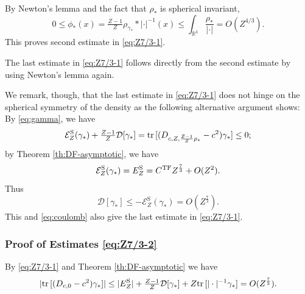 \documentclass[a4paper]{amsart}
\def\tr{{\rm tr \,}}
\def\R{\mathbb{R}}
\def\cD{\mathcal{D}}
\def\cE{{\mathcal E}}
\begin{document}
By Newton's lemma and the fact that $\rho_*$ is spherical invariant,
\begin{equation}
  0\leq\phi_*(x)=\tfrac{Z-1}{Z}\rho_{\gamma_*}*|\cdot|^{-1}(x)\leq \int_{\R^3}\frac{\rho_*}{|\cdot|}=O(Z^{4/3}).
\end{equation}
This proves second estimate in \eqref{eq:Z7/3-1}. 

The last estimate in \eqref{eq:Z7/3-1} follows directly from the
second estimate by using Newton's lemma again.

We remark, though, that the last estimate in \eqref{eq:Z7/3-1} does
not hinge on the spherical symmetry of the density as the following
alternative argument shows: By \eqref{eq:gamma}, we have
\begin{equation}
  \cE_{Z}^{\rm S}(\gamma_*)+\tfrac{Z-1}{Z}\cD[\gamma_*]
  = \tr[(D_{c,Z,\frac{Z-1}{Z}\rho_*}-c^2)\gamma_*]\leq 0;
\end{equation}
by Theorem \ref{th:DF-asymptotic}, we have
\begin{equation}
    \cE_{Z}^{\rm S}(\gamma_*) =E_{Z}^{\rm S} = C^\mathrm{TF}Z^{\frac73} +O(Z^2).
\end{equation}
Thus
\begin{equation}\label{eq:D-gamma}
    \cD[\gamma_*]\leq -\cE_{Z}^\mathrm{S}(\gamma_*)=O(Z^{\frac73}).
\end{equation}
This and \eqref{eq:coulomb} also give the last estimate in \eqref{eq:Z7/3-1}.

\subsubsection{Proof of Estimates \eqref{eq:Z7/3-2}}
By \eqref{eq:Z7/3-1} and Theorem \ref{th:DF-asymptotic} we have
\begin{align}\label{eq:D-c^2}
    |\tr[(D_{c,0}-c^2)\gamma_*]|\leq |E_{Z}^{\rm S}|+\tfrac{Z-1}{Z}\cD[\gamma_*]+ Z\tr[|\cdot|^{-1}\gamma_*]=O(Z^{\frac73}).
\end{align}
\end{document}
